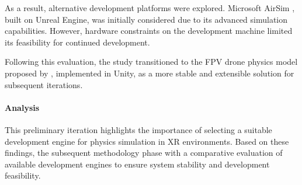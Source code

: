 As a result, alternative development platforms were explored. Microsoft AirSim \parencite{shah_airsim_2017}, built on Unreal Engine, was initially considered due to its advanced simulation capabilities. However, hardware constraints on the development machine limited its feasibility for continued development.

Following this evaluation, the study transitioned to the FPV drone physics model proposed by \parencite{yuetility2022fpvphysics}, implemented in Unity, as a more stable and extensible solution for subsequent iterations.

\paragraph{Analysis}

This preliminary iteration highlights the importance of selecting a suitable development engine for physics simulation in XR environments. Based on these findings, the subsequent methodology phase with a comparative evaluation of available development engines to ensure system stability and development feasibility.
